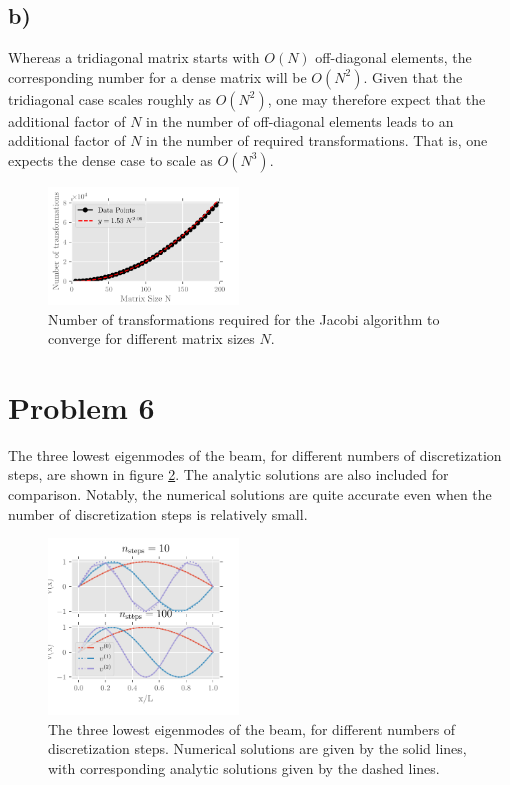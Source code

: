 \documentclass[english,notitlepage,reprint,nofootinbib]{revtex4-2}  %
\begin{document}
\subsection*{b)}
Whereas a tridiagonal matrix starts with \(O(N)\) off-diagonal elements, the corresponding number for a dense matrix will be \(O(N^2)\).
Given that the tridiagonal case scales roughly as \(O(N^2)\), one may therefore expect that the additional factor of \(N\) in the number of off-diagonal elements leads to an additional factor of \(N\) in the number of required transformations.
That is, one expects the dense case to scale as \(O(N^3)\).

\begin{figure}
    \centering
    \includegraphics[width=0.45\textwidth]{Code/output/iterations.pdf}
    \caption{Number of transformations required for the Jacobi algorithm to converge for different matrix sizes \(N\).}
    \label{fig:iterations}
\end{figure}

\section{Problem 6}
The three lowest eigenmodes of the beam, for different numbers of discretization steps, are shown in figure \ref{fig:eigenvectors}. 
The analytic solutions are also included for comparison.
Notably, the numerical solutions are quite accurate even when the number of discretization steps is relatively small.
\begin{figure}
    \centering
    \includegraphics[width=0.45\textwidth]{Code/output/eigenvectors.pdf}
    \caption{The three lowest eigenmodes of the beam, for different numbers of discretization steps.
    Numerical solutions are given by the solid lines, with corresponding analytic solutions given by the dashed lines.}
    \label{fig:eigenvectors}
\end{figure}


\onecolumngrid
% 


\end{document}
